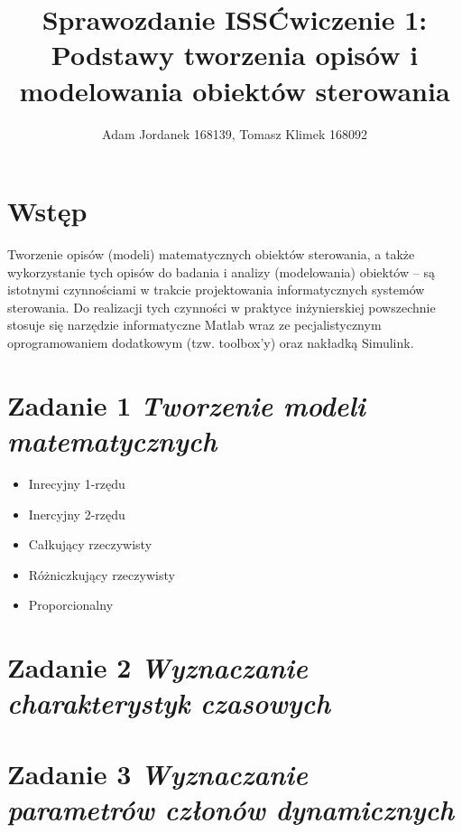 \documentclass[a4paper,10pt]{article}
\title{Sprawozdanie ISS\newline\small Ćwiczenie 1: Podstawy tworzenia opisów i modelowania obiektów sterowania}
\author{Adam Jordanek 168139, Tomasz Klimek 168092}
\begin{document}
\maketitle

 
 
\section{Wstęp}\label{sec:wstep}
Tworzenie opisów (modeli) matematycznych obiektów sterowania, a także wykorzystanie tych opisów do badania i analizy (modelowania) obiektów – są istotnymi czynnościami w trakcie projektowania informatycznych systemów sterowania. Do realizacji tych czynności w praktyce inżynierskiej powszechnie stosuje się narzędzie informatyczne Matlab wraz ze pecjalistycznym oprogramowaniem dodatkowym (tzw. toolbox’y) oraz nakładką Simulink.
 
\section{Zadanie 1 \textit{\small Tworzenie modeli matematycznych}}\label{sec:zad1}
\begin{itemize}
\item Inrecyjny 1-rzędu
\item Inercyjny 2-rzędu
\item Całkujący rzeczywisty
\item Różniczkujący rzeczywisty
\item Proporcionalny
\end{itemize}
\section{Zadanie 2 \textit{\small Wyznaczanie charakterystyk czasowych}}\label{sec:zad2}
\section{Zadanie 3 \textit{\small Wyznaczanie parametrów członów dynamicznych}}\label{sec:zad3}

 
\end{document}
